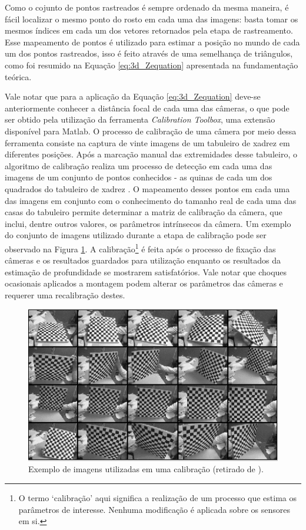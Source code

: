 Como o cojunto de pontos rastreados é sempre ordenado da mesma maneira, é fácil localizar o mesmo ponto do rosto em cada uma das imagens: basta tomar os mesmos índices em cada um dos vetores retornados pela etapa de rastreamento. Esse mapeamento de pontos é utilizado para estimar a posição no mundo de cada um dos pontos rastreados, isso é feito através de uma semelhança de triângulos, como foi resumido na Equação \ref{eq:3d_Zequation} apresentada na fundamentação teórica.

Vale notar que para a aplicação da Equação \ref{eq:3d_Zequation} deve-se anteriormente conhecer a distância focal de cada uma das câmeras, o que pode ser obtido pela utilização da ferramenta \textit{Calibration Toolbox}, uma extensão disponível para Matlab. O processo de calibração de uma câmera por meio dessa ferramenta consiste na captura de vinte imagens de um tabuleiro de xadrez em diferentes posições. Após a marcação manual das extremidades desse tabuleiro, o algoritmo de calibração realiza um processo de detecção em cada uma das imagens de um conjunto de pontos conhecidos - as quinas de cada um dos quadrados do tabuleiro de xadrez . O mapeamento desses pontos em cada uma das imagens em conjunto com o conhecimento do tamanho real de cada uma das casas do tabuleiro permite determinar a matriz de calibração da câmera, que inclui, dentre outros valores, os parâmetros intrínsecos da câmera. Um exemplo do conjunto de imagens utilizado durante a etapa de calibração pode ser observado na Figura \ref{fig:calib_imagens}.
A calibração\footnote{O termo `calibração' aqui significa a realização de um processo que estima os parâmetros de interesse. Nenhuma modificação é aplicada sobre os sensores em si.} é feita após o processo de fixação das câmeras e os resultados guardados para utilização enquanto os resultados da estimação de profundidade se mostrarem satisfatórios. Vale notar que choques ocasionais aplicados a montagem podem alterar os parâmetros das câmeras e requerer uma recalibração destes. 

\begin{figure}[h!]
\centering
\includegraphics[width=.6\linewidth]{figs/TG_calib_images.png}
\caption{Exemplo de imagens utilizadas em uma calibração (retirado de \cite{bouguetML}).}
\label{fig:calib_imagens}
\end{figure}

